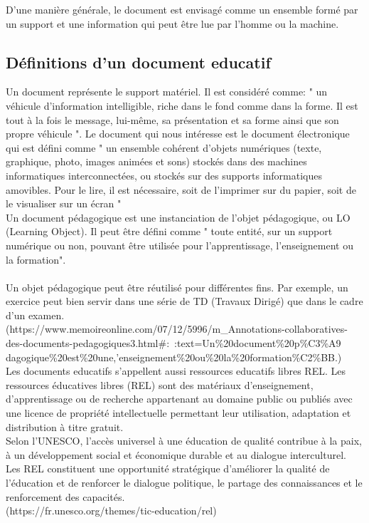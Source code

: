 \documentclass[12pt]{report}
\begin{document}
D’une manière générale, le document est envisagé comme un ensemble formé par un support et une information qui peut être lue par l’homme ou la machine.

\subsection{Définitions d'un document educatif}

Un document représente le support matériel. Il est considéré comme: " un véhicule d'information intelligible, riche dans le fond comme dans la forme. Il est tout à la fois le message, lui-même, sa présentation et sa forme ainsi que son propre véhicule ". Le document qui nous intéresse est le document électronique qui est défini comme " un ensemble cohérent d'objets numériques (texte, graphique, photo, images animées et sons) stockés dans des machines informatiques interconnectées, ou stockés sur des supports informatiques amovibles. Pour le lire, il est nécessaire, soit de l'imprimer sur du papier, soit de le visualiser sur un écran " \\
Un document pédagogique est une instanciation de l'objet pédagogique, ou LO (Learning Object). Il peut être défini comme " toute entité, sur un support numérique ou non, pouvant être utilisée pour l'apprentissage, l'enseignement ou la formation".\\
\\Un objet pédagogique peut être réutilisé pour différentes fins. Par exemple, un exercice peut bien servir dans une série de TD (Travaux Dirigé) que dans le cadre d'un examen.
\\(https://www.memoireonline.com/07/12/5996/m\_Annotations-collaboratives-des-documents-pedagogiques3.html\#:~:text=Un\%20document\%20p\%C3\%A9\\dagogique\%20est\%20une,'enseignement\%20ou\%20la\%20formation\%C2\%BB.)\\

Les documents educatifs s'appellent aussi ressources educatifs libres REL.
Les ressources éducatives libres (REL) sont des matériaux d'enseignement, d'apprentissage ou de recherche appartenant au domaine public ou publiés avec une licence de propriété intellectuelle permettant leur utilisation, adaptation et distribution à titre gratuit.
\\Selon l’UNESCO, l'accès universel à une éducation de qualité contribue à la paix, à un développement social et économique durable et au dialogue interculturel. Les REL constituent une opportunité stratégique d'améliorer la qualité de l’éducation et de renforcer le dialogue politique, le partage des connaissances et le renforcement des capacités.
\\(https://fr.unesco.org/themes/tic-education/rel)
\end{document}
